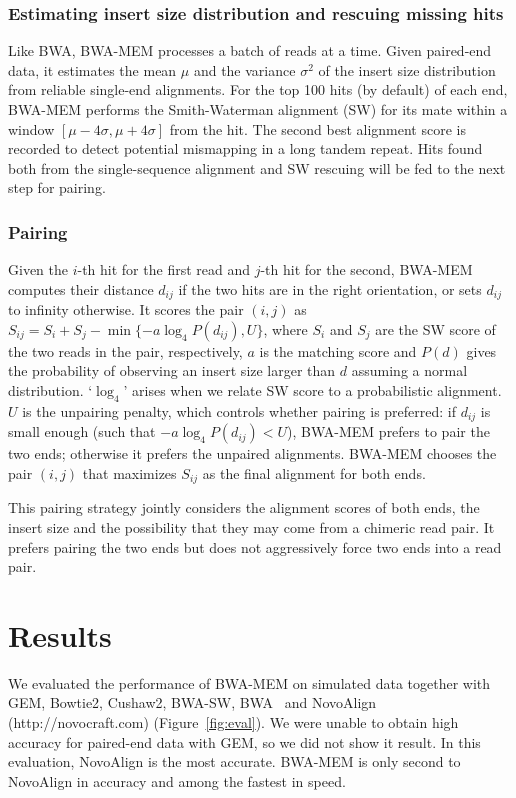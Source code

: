 \documentclass{bioinfo}
\begin{document}
\begin{methods}
\subsubsection{Estimating insert size distribution and rescuing missing hits}
Like BWA, BWA-MEM processes a batch of reads at a time.  Given paired-end data,
it estimates the mean $\mu$ and the variance $\sigma^2$ of the insert size
distribution from reliable single-end alignments. For the top 100 hits (by
default) of each end, BWA-MEM performs the Smith-Waterman alignment (SW) for
its mate within a window $[\mu-4\sigma,\mu+4\sigma]$ from the hit. The second
best alignment score is recorded to detect potential mismapping in a long
tandem repeat.  Hits found both from the single-sequence alignment and SW
rescuing will be fed to the next step for pairing.

\subsubsection{Pairing} Given the $i$-th hit for the first read and $j$-th hit
for the second, BWA-MEM computes their distance $d_{ij}$ if the two hits are in
the right orientation, or sets $d_{ij}$ to infinity otherwise. It scores the
pair $(i,j)$ as $S_{ij}=S_i+S_j-\min\{-a\log_4 P(d_{ij}),U\}$, where $S_i$ and
$S_j$ are the SW score of the two reads in the pair, respectively, $a$ is the
matching score and $P(d)$ gives the probability of observing an insert size
larger than $d$ assuming a normal distribution. `$\log_4$' arises when we
relate SW score to a probabilistic alignment. $U$ is the unpairing penalty,
which controls whether pairing is preferred: if $d_{ij}$ is small enough (such
that $-a\log_4 P(d_{ij})<U$), BWA-MEM prefers to pair the two ends; otherwise
it prefers the unpaired alignments. BWA-MEM chooses the pair $(i,j)$ that
maximizes $S_{ij}$ as the final alignment for both ends.

This pairing strategy jointly considers the alignment scores of both ends,
the insert size and the possibility that they may come from a chimeric read
pair. It prefers pairing the two ends but does not aggressively force two ends
into a read pair.

\end{methods}

\section{Results}

We evaluated the performance of BWA-MEM on simulated data together with
GEM, Bowtie2, Cushaw2, BWA-SW, BWA~\citep{Li:2009uq} and NovoAlign
(http://novocraft.com) (Figure~\ref{fig:eval}). We were unable to obtain high
accuracy for paired-end data with GEM, so we did not show it result. In this
evaluation, NovoAlign is the most accurate. BWA-MEM is only second to NovoAlign
in accuracy and among the fastest in speed.
\end{document}
